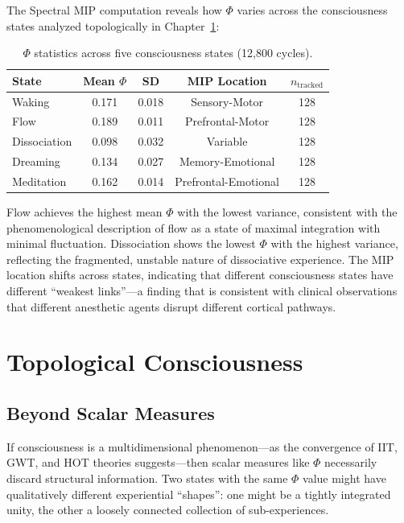\documentclass[12pt]{book}
\begin{document}
The Spectral MIP computation reveals how $\Phi$ varies across the consciousness states analyzed topologically in Chapter~\ref{ch:topology}:

\begin{table}[H]
\centering
\caption{$\Phi$ statistics across five consciousness states (12,800 cycles).}
\label{tab:phi-by-state}
\begin{tabular}{lcccc}
\toprule
\textbf{State} & \textbf{Mean $\Phi$} & \textbf{SD} & \textbf{MIP Location} & \textbf{$n_{\text{tracked}}$} \\
\midrule
Waking & 0.171 & 0.018 & Sensory-Motor & 128 \\
Flow & 0.189 & 0.011 & Prefrontal-Motor & 128 \\
Dissociation & 0.098 & 0.032 & Variable & 128 \\
Dreaming & 0.134 & 0.027 & Memory-Emotional & 128 \\
Meditation & 0.162 & 0.014 & Prefrontal-Emotional & 128 \\
\bottomrule
\end{tabular}
\end{table}

Flow achieves the highest mean $\Phi$ with the lowest variance, consistent with the phenomenological description of flow as a state of maximal integration with minimal fluctuation. Dissociation shows the lowest $\Phi$ with the highest variance, reflecting the fragmented, unstable nature of dissociative experience. The MIP location shifts across states, indicating that different consciousness states have different ``weakest links''---a finding that is consistent with clinical observations that different anesthetic agents disrupt different cortical pathways.


\chapter{Topological Consciousness}
\label{ch:topology}

\section{Beyond Scalar Measures}

If consciousness is a multidimensional phenomenon---as the convergence of IIT, GWT, and HOT theories suggests---then scalar measures like $\Phi$ necessarily discard structural information. Two states with the same $\Phi$ value might have qualitatively different experiential ``shapes'': one might be a tightly integrated unity, the other a loosely connected collection of sub-experiences.
\end{document}
